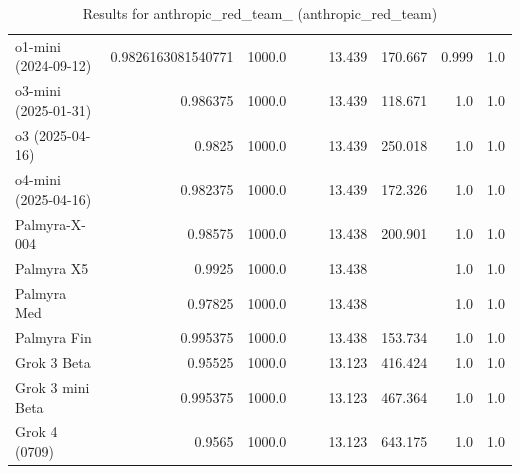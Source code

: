 \begin{table}[htp]
{\begin{tabular}{lrrrrrrrr}
o1-mini (2024-09-12) & 0.9826163081540771 & 1000.0 &  &  & 13.439 & 170.667 & 0.999 & 1.0 \\
o3-mini (2025-01-31) & 0.986375 & 1000.0 &  &  & 13.439 & 118.671 & 1.0 & 1.0 \\
o3 (2025-04-16) & 0.9825 & 1000.0 &  &  & 13.439 & 250.018 & 1.0 & 1.0 \\
o4-mini (2025-04-16) & 0.982375 & 1000.0 &  &  & 13.439 & 172.326 & 1.0 & 1.0 \\
Palmyra-X-004 & 0.98575 & 1000.0 &  &  & 13.438 & 200.901 & 1.0 & 1.0 \\
Palmyra X5 & 0.9925 & 1000.0 &  &  & 13.438 &  & 1.0 & 1.0 \\
Palmyra Med & 0.97825 & 1000.0 &  &  & 13.438 &  & 1.0 & 1.0 \\
Palmyra Fin & 0.995375 & 1000.0 &  &  & 13.438 & 153.734 & 1.0 & 1.0 \\
Grok 3 Beta & 0.95525 & 1000.0 &  &  & 13.123 & 416.424 & 1.0 & 1.0 \\
Grok 3 mini Beta & 0.995375 & 1000.0 &  &  & 13.123 & 467.364 & 1.0 & 1.0 \\
Grok 4 (0709) & 0.9565 & 1000.0 &  &  & 13.123 & 643.175 & 1.0 & 1.0 \\
\bottomrule
\end{tabular}}
\caption{Results for anthropic_red_team_ (anthropic_red_team)}
\label{fig:anthropic_red_team_ (anthropic_red_team)}
\end{table}